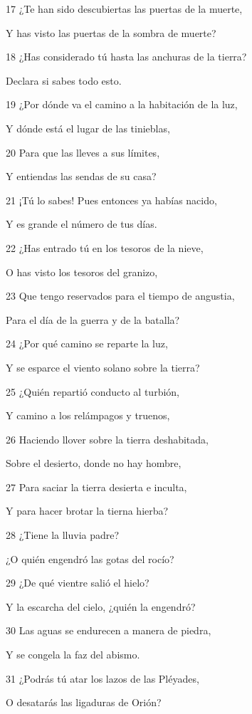 \par 17 ¿Te han sido descubiertas las puertas de la muerte,
\par Y has visto las puertas de la sombra de muerte?
\par 18 ¿Has considerado tú hasta las anchuras de la tierra?
\par Declara si sabes todo esto.
\par 19 ¿Por dónde va el camino a la habitación de la luz,
\par Y dónde está el lugar de las tinieblas,
\par 20 Para que las lleves a sus límites,
\par Y entiendas las sendas de su casa?
\par 21 ¡Tú lo sabes! Pues entonces ya habías nacido,
\par Y es grande el número de tus días.
\par 22 ¿Has entrado tú en los tesoros de la nieve,
\par O has visto los tesoros del granizo,
\par 23 Que tengo reservados para el tiempo de angustia,
\par Para el día de la guerra y de la batalla?
\par 24 ¿Por qué camino se reparte la luz,
\par Y se esparce el viento solano sobre la tierra? 
\par 25 ¿Quién repartió conducto al turbión,
\par Y camino a los relámpagos y truenos,
\par 26 Haciendo llover sobre la tierra deshabitada, 
\par Sobre el desierto, donde no hay hombre,
\par 27 Para saciar la tierra desierta e inculta,
\par Y para hacer brotar la tierna hierba?
\par 28 ¿Tiene la lluvia padre?
\par ¿O quién engendró las gotas del rocío?
\par 29 ¿De qué vientre salió el hielo?
\par Y la escarcha del cielo, ¿quién la engendró?
\par 30 Las aguas se endurecen a manera de piedra,
\par Y se congela la faz del abismo.
\par 31 ¿Podrás tú atar los lazos de las Pléyades,
\par O desatarás las ligaduras de Orión? 

